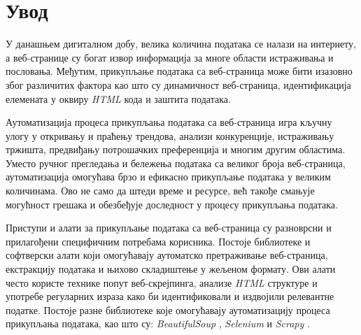 \documentclass[12pt,oneside]{memoir}
\begin{document}
\frontmatter
\naslovna
\komisija
\apstrakt

\tableofcontents*

\mainmatter

\chapter{Увод}
У данашњем дигиталном добу, велика количина података се налази на интернету, а веб-странице су богат извор информација за многе области истраживања и пословања. Међутим, прикупљање података са веб-страница може бити изазовно због различитих фактора као што су динамичност веб-страница, идентификација елемената у оквиру \textit{HTML} кода и заштита података.

Аутоматизација процеса прикупљања података са веб-страница игра кључну улогу у откривању и праћењу трендова, анализи конкуренције, истраживању тржишта, предвиђању потрошачких преференција и многим другим областима. Уместо ручног прегледања и бележења података са великог броја веб-страница, аутоматизација омогућава брзо и ефикасно прикупљање података у великим количинама. Ово не само да штеди време и ресурсе, већ такође смањује могућност грешака и обезбеђује доследност у процесу прикупљања података.

Приступи и алати за прикупљање података са веб-страница су разноврсни и прилагођени специфичним потребама корисника. Постоје библиотеке и софтверски алати који омогућавају аутоматско претраживање веб-страница, екстракцију података и њихово складиштење у жељеном формату. Ови алати често користе технике попут веб-скрејпинга, анализе \textit{HTML} структуре и употребе регуларних израза како би идентификовали и издвојили релевантне податке. Постоје разне библиотеке које омогућавају аутоматизацију процеса прикупљања података, као што су: \textit{BeautifulSoup} \cite{beautifulSoapDocs}, \textit{Selenium} 
 \cite{selenium} и \textit{Scrapy} \cite{scrapy}.
\end{document}

